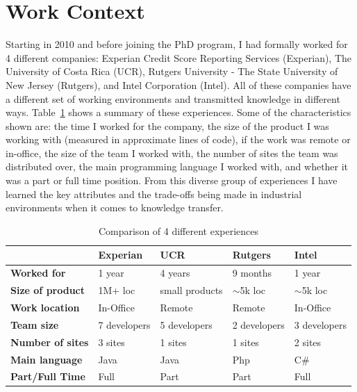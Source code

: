 \documentclass[12pt, letterpaper]{article}
\begin{document}
\section{Work Context}
Starting in 2010 and before joining the PhD program, I had formally worked for 4 different companies: Experian Credit 
Score Reporting Services (Experian), The University of Costa Rica (UCR), Rutgers University - The State University of New 
Jersey (Rutgers), and Intel Corporation (Intel). All of these companies 
have a different set of working environments and transmitted knowledge in different ways. Table~\ref{comparisonTable}
shows a summary of
these experiences. Some of the characteristics shown are: 
the time I worked for the company, the 
size of the product I was working with (measured in approximate lines of code), if the work was remote or in-office, the size of the 
team I worked with, the number of sites the team was distributed over, the main programming language I worked with,
and whether it was a part or full time position.
From this diverse group of experiences I have learned the key attributes and the trade-offs being made in industrial environments
when it comes to knowledge transfer. 

\begin{table}[] 
\centering
\caption{Comparison of 4 different experiences}
\label{comparisonTable}
\begin{tabular}{lllll}
\hline
                         & \textbf{Experian}      & \textbf{UCR}   & \textbf{Rutgers} & \textbf{Intel} \\ \hline
                         
\textbf{Worked for}      & 1 year                 & 4 years        & 9 months         & 1 year         \\ 
\textbf{Size of product} & 1M+ loc                & small products & $\sim$5k loc     & $\sim$5k loc   \\ 
\textbf{Work location}   & In-Office              & Remote         & Remote           & In-Office      \\ 
\textbf{Team size}       & 7 developers           & 5 developers   & 2 developers     & 3 developers   \\ 
\textbf{Number of sites} & 3 sites                & 1 sites        & 1 sites          & 2 sites        \\ 
\textbf{Main language}   & Java                   & Java           & Php              & C\#            \\ 
\textbf{Part/Full Time}  & Full                   & Part           & Part             & Full           \\ \hline
\end{tabular}
\end{table}
\end{document}
